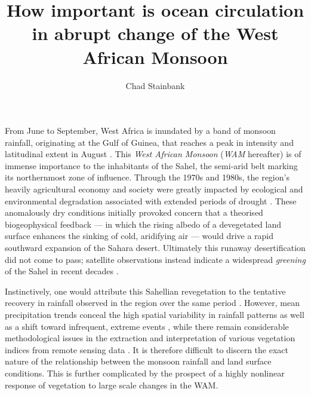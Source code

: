 \documentclass[a4paper]{article}
\begin{document}
\title{How important is ocean circulation in abrupt change of the West African Monsoon}
\author{Chad Stainbank}
\maketitle

From June to September, West Africa is inundated by a band of monsoon rainfall, originating at the Gulf of Guinea, that reaches a peak in intensity and latitudinal extent in August \parencite{sultan2003west}.
This \emph{West African Monsoon} (\emph{WAM} hereafter) is of immense importance to the inhabitants of the Sahel, the semi-arid belt marking its northernmost zone of influence.
Through the 1970s and 1980s, the region's heavily agricultural economy and society were greatly impacted by ecological and environmental degradation associated with extended periods of drought \parencite{benson1998impact, olsson1993causes, walther2016review}.
These anomalously dry conditions initially provoked concern that a theorised biogeophysical feedback --- in which the rising albedo of a devegetated land surface enhances the sinking of cold, aridifying air \parencite{charney1975dynamics, charney1975drought} --- would drive a rapid southward expansion of the Sahara desert.
Ultimately this runaway desertification did not come to pass; satellite observations instead indicate a widespread \emph{greening} of the Sahel in recent decades \parencite{olsson2005recent, dardel2014re}.

Instinctively, one would attribute this Sahellian revegetation to the tentative recovery in rainfall observed in the region over the same period \parencite{lebel2009recent}.
However, mean precipitation trends conceal the high spatial variability in rainfall patterns as well as a shift toward infrequent, extreme events \parencite{nicholson2013west, panthou2014recent}, while there remain considerable methodological issues in the extraction and interpretation of various vegetation indices from remote sensing data \parencite{fensholt2013assessing, dardel2014rain}.
It is therefore difficult to discern the exact nature of the relationship between the monsoon rainfall and land surface conditions. This is further complicated by the prospect of a highly nonlinear response of vegetation to large scale changes in the WAM.


\printbibliography{}
\end{document}
